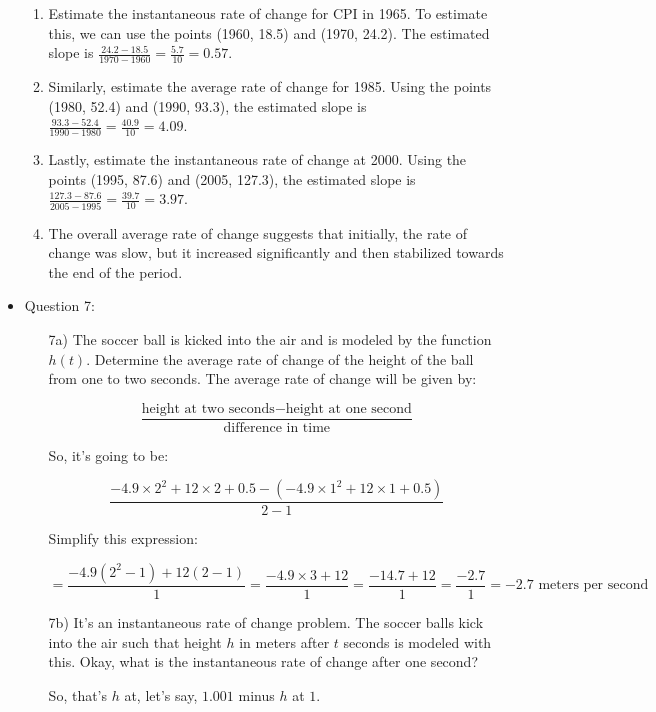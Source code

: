 \documentclass{article}
\begin{document}
\begin{itemize}
\begin{enumerate}
    \item Estimate the instantaneous rate of change for CPI in 1965. To estimate this, we can use the points (1960, 18.5) and (1970, 24.2). The estimated slope is \(\frac{24.2 - 18.5}{1970 - 1960} = \frac{5.7}{10} = 0.57\).
    
    \item Similarly, estimate the average rate of change for 1985. Using the points (1980, 52.4) and (1990, 93.3), the estimated slope is \(\frac{93.3 - 52.4}{1990 - 1980} = \frac{40.9}{10} = 4.09\).
    
    \item Lastly, estimate the instantaneous rate of change at 2000. Using the points (1995, 87.6) and (2005, 127.3), the estimated slope is \(\frac{127.3 - 87.6}{2005 - 1995} = \frac{39.7}{10} = 3.97\).
    
    \item The overall average rate of change suggests that initially, the rate of change was slow, but it increased significantly and then stabilized towards the end of the period.
\end{enumerate}

\item Question 7:
\begin{enumerate}
    \item[7a)] The soccer ball is kicked into the air and is modeled by the function \( h(t) \). Determine the average rate of change of the height of the ball from one to two seconds. The average rate of change will be given by:

\[
\frac{{\text{{height at two seconds}} - \text{{height at one second}}}}{{\text{{difference in time}}}}
\]

So, it's going to be:

\[
\frac{{-4.9 \times 2^2 + 12 \times 2 + 0.5 - (-4.9 \times 1^2 + 12 \times 1 + 0.5)}}{{2 - 1}}
\]

Simplify this expression:

\[
= \frac{{-4.9(2^2 - 1) + 12(2 - 1)}}{{1}} = \frac{{-4.9 \times 3 + 12}}{{1}} = \frac{{-14.7 + 12}}{{1}} = \frac{{-2.7}}{{1}} = -2.7 \text{ meters per second}
\]
 \item[7b)] It's an instantaneous rate of change problem. The soccer balls kick into the air such that height \( h \) in meters after \( t \) seconds is modeled with this. Okay, what is the instantaneous rate of change after one second?

So, that's \( h \) at, let's say, \( 1.001 \) minus \( h \) at \( 1 \).


\end{enumerate}
\end{itemize}
\end{document}
